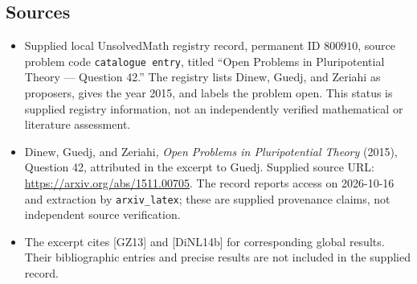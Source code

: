 \documentclass[11pt]{article}
\begin{document}
\subsection{Sources}
\begin{itemize}
\item Supplied local UnsolvedMath registry record, permanent ID \(800910\), source problem code \texttt{catalogue entry}, titled ``Open Problems in Pluripotential Theory --- Question 42.'' The registry lists Dinew, Guedj, and Zeriahi as proposers, gives the year 2015, and labels the problem open. This status is supplied registry information, not an independently verified mathematical or literature assessment.
\item Dinew, Guedj, and Zeriahi, \emph{Open Problems in Pluripotential Theory} (2015), Question 42, attributed in the excerpt to Guedj. Supplied source URL: \url{https://arxiv.org/abs/1511.00705}. The record reports access on 2026-10-16 and extraction by \texttt{arxiv\_latex}; these are supplied provenance claims, not independent source verification.
\item The excerpt cites [GZ13] and [DiNL14b] for corresponding global results. Their bibliographic entries and precise results are not included in the supplied record.
\end{itemize}
\end{document}
